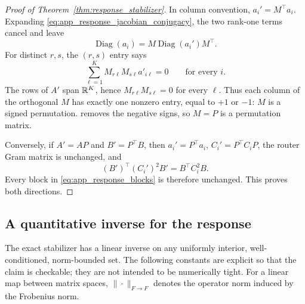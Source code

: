 \begin{proof}[Proof of Theorem~\ref{thm:response_stabilizer}]
In column convention, \(a_i'=M^\top a_i\).  Expanding
\eqref{eq:app_response_jacobian_conjugacy}, the two rank-one terms cancel and
leave
\begin{equation}
 \operatorname{Diag}(a_i)
 =M\operatorname{Diag}(a_i')M^\top.
 \label{eq:app_response_diagonal_algebra}
\end{equation}
For distinct \(r,s\), the \((r,s)\) entry says
\begin{equation}
 \sum_{\ell=1}^K M_{r\ell}M_{s\ell}a'_{i\ell}=0
 \qquad\text{for every }i.
\end{equation}
The rows of \(A'\) span \(\mathbb{R}^K\), hence
\(M_{r\ell}M_{s\ell}=0\) for every \(\ell\).  Thus each column of the
orthogonal \(M\) has exactly one nonzero entry, equal to \(+1\) or \(-1\):
\(M\) is a signed permutation.  
removes the negative signs, so \(M=P\) is a permutation matrix.

Conversely, if \(A'=AP\) and \(B'=P^\top B\), then
\(a_i'=P^\top a_i\), \(C_i'=P^\top C_iP\), the router Gram matrix is
unchanged, and
\begin{equation}
 (B')^\top(C_i')^2B'=B^\top C_i^2B.
\end{equation}
Every block in \eqref{eq:app_response_blocks} is therefore unchanged.  This
proves both directions.
\end{proof}

\subsection{A quantitative inverse for the response}
\label{app:response_quantitative}

The exact stabilizer has a linear inverse on any uniformly interior,
well-conditioned, norm-bounded set.  The following constants are explicit so
that the claim is checkable; they are not intended to be numerically tight.
For a linear map between matrix spaces, \(\|\cdot\|_{F\to F}\) denotes the
operator norm induced by the Frobenius norm.

